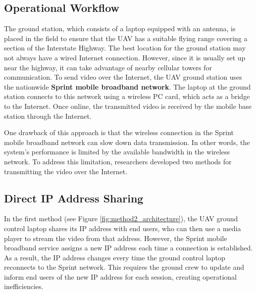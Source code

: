 \subsection{Operational Workflow}
The ground station, which consists of a laptop equipped with an antenna, is placed in the field to ensure that the UAV has a suitable flying range covering a section of the Interstate Highway. The best location for the ground station may not always have a wired Internet connection. However, since it is usually set up near the highway, it can take advantage of nearby cellular towers for communication. To send video over the Internet, the UAV ground station uses the nationwide \textbf{Sprint mobile broadband network}. The laptop at the ground station connects to this network using a wireless PC card, which acts as a bridge to the Internet. Once online, the transmitted video is received by the mobile base station through the Internet.

\vspace{\baselineskip} %

One drawback of this approach is that the wireless connection in the Sprint mobile broadband network can slow down data transmission. In other words, the system's performance is limited by the available bandwidth in the wireless network. To address this limitation, researchers developed two methods for transmitting the video over the Internet.

\vspace{\baselineskip} %

\subsection{Direct IP Address Sharing}
In the first method (see Figure \ref{fig:method2_architecture}), the UAV ground control laptop shares its IP address with end users, who can then use a media player to stream the video from that address. However, the Sprint mobile broadband service assigns a new IP address each time a connection is established. As a result, the IP address changes every time the ground control laptop reconnects to the Sprint network. This requires the ground crew to update and inform end users of the new IP address for each session, creating operational inefficiencies.

\vspace{\baselineskip} %

